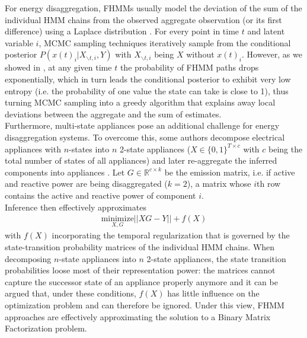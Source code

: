 For energy disaggregation, FHMMs usually model the deviation of the sum of the individual HMM chains from the observed aggregate observation (or its first difference) using a Laplace distribution \cite{kolter2012fhmm,lange2016disaggregation}. For every point in time $t$ and latent variable $i$, MCMC sampling techniques iteratively sample from the conditional posterior $P(x(t)_i|X_{\backslash t,i}, Y)$ with $X_{\backslash t,i}$ being $X$ without $x(t)_i$. However, as we showed in \cite{lange2016disaggregation}, at any given time $t$ the probability of FHMM paths drops exponentially, which in turn leads the conditional posterior to exhibit very low entropy (i.e. the probability of one value the state can take is close to 1), thus turning MCMC sampling into a greedy algorithm that explains away local deviations between the aggregate and the sum of estimates.\\
Furthermore, multi-state appliances pose an additional challenge for energy disaggregation systems. To overcome this, some authors decompose electrical appliances with $n$-states into $n$ 2-state appliances ($X \in \{0,1\}^{T\times c}$ with $c$ being the total number of states of all appliances) and later re-aggregate the inferred components into appliances \cite{jiafully}. Let $G \in \mathbb{R}^{c \times k}$ be the emission matrix, i.e. if active and reactive power are being disaggregated ($k=2$), a matrix whose $i$th row contains the active and reactive power of component $i$. \\Inference then effectively approximates 
\begin{align*}
\underset{X,G}{\text{minimize}} ||XG - Y|| + f(X)
\end{align*}
 with $f(X)$ incorporating the temporal regularization that is governed by the state-transition probability matrices of the individual HMM chains. When decomposing $n$-state appliances into $n$ 2-state appliances, the state transition probabilities loose most of their representation power: the matrices cannot capture the successor state of an appliance properly anymore and it can be argued that, under these conditions, $f(X)$ has little influence on the optimization problem and can therefore be ignored. Under this view, FHMM approaches are effectively approximating the solution to a Binary Matrix Factorization problem.

